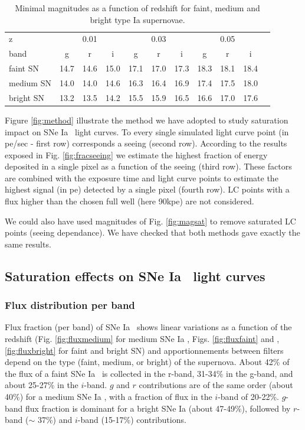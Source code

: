 \documentclass[\docopts]{\docclass}
\newcommand{\sne}{{SNe Ia }}
\begin{document}
\begin{table}[!htbp]
  \caption{Minimal magnitudes as a function of redshift for faint, medium and bright type Ia supernovae.}\label{tab:minimag}
  \begin{center}
    \begin{tabular}{l|ccc|ccc|cccc}
      \hline
      \hline
      z        &\multicolumn{3}{c}{0.01} & \multicolumn{3}{c}{0.03} & \multicolumn{3}{c}{0.05} \\
      band & g & r & i & g & r & i & g & r &i \\
      \hline
      \hline
      faint SN   & 14.7 & 14.6 & 15.0 & 17.1 & 17.0 & 17.3 & 18.3 & 18.1 & 18.4 \\
      medium SN  & 14.0 & 14.0 & 14.6 & 16.3 & 16.4 & 16.9 & 17.4 & 17.5 & 18.0 \\
      bright SN & 13.2 & 13.5 & 14.2 & 15.5 & 15.9 & 16.5 & 16.6 & 17.0 & 17.6\\
      \hline
    \end{tabular}
  \end{center}
  \end{table}

Figure \ref{fig:method} illustrate the method we have adopted to study saturation impact on \sne~light curves. To every single simulated light curve point (in pe/sec - first row) corresponds a seeing (second row). According to the results exposed in Fig. \ref{fig:fracseeing} we estimate the highest fraction of energy deposited in a single pixel as a function of the seeing (third row). These factors are combined with the exposure time and  light curve points to estimate the highest signal (in pe) detected by a single pixel (fourth row). LC points with a flux higher than the chosen full well (here 90kpe) are not considered.\par
We could also have used  magnitudes of Fig. \ref{fig:magsat} to remove saturated LC points (seeing dependance). We have checked that both methods gave exactly the same results. 

\subsection{Saturation effects on \sne~light curves}

\subsubsection{Flux distribution per band}
Flux fraction (per band) of \sne~shows linear variations as a function of the redshift (Fig. \ref{fig:fluxmedium} for medium \sne, Figs. \ref{fig:fluxfaint} and ,\ref{fig:fluxbright} for faint and bright SN) and apportionnements between filters depend on the type (faint, medium, or bright) of the supernova. About 42\% of the flux of a faint \sne~is collected in the r-band, 31-34\% in the g-band, and about 25-27\%  in the $i$-band. $g$ and $r$ contributions are of the same order (about 40\%) for a medium \sne, with a fraction of flux in the $i$-band of 20-22\%.  $g$-band flux fraction is dominant for a bright \sne (about 47-49\%), followed by $r$-band ($\sim$ 37\%) and $i$-band (15-17\%) contributions.
\end{document}
